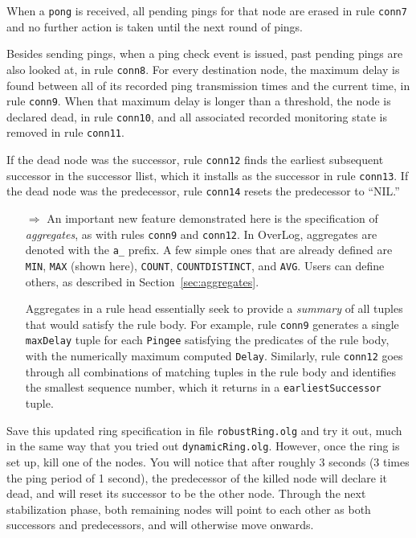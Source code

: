 \documentclass{article}
\begin{document}
When a \lstinline$pong$ is received, all pending pings for that node are
erased in rule \lstinline$conn7$ and no further action is taken until
the next round of pings.

Besides sending pings, when a ping check event is issued, past pending
pings are also looked at, in rule \lstinline$conn8$. For every
destination node, the maximum delay is found between all of its recorded
ping transmission times and the current time, in rule
\lstinline$conn9$. When that maximum delay is longer than a threshold,
the node is declared dead, in rule \lstinline$conn10$, and all
associated recorded monitoring state is removed in rule
\lstinline$conn11$.

If the dead node was the successor, rule \lstinline$conn12$ finds the
earliest subsequent successor in the successor llist, which it installs
as the successor in rule \lstinline$conn13$.  If the dead node was the
predecessor, rule \lstinline$conn14$ resets the predecessor to ``NIL.''

\begin{itemize}
\item[$\Longrightarrow$] An important new feature demonstrated here is
  the specification of \emph{aggregates}, as with rules
  \lstinline$conn9$ and \lstinline$conn12$.  In OverLog, aggregates are
  denoted with the \texttt{a\_} prefix. A few simple ones that are
  already defined are \lstinline$MIN$, \lstinline$MAX$ (shown here),
  \lstinline$COUNT$, \lstinline$COUNTDISTINCT$, and
  \lstinline$AVG$. Users can define others, as described in
  Section~\ref{sec:aggregates}.

  Aggregates in a rule head essentially seek to provide a \emph{summary}
  of all tuples that would satisfy the rule body.  For example, rule
  \lstinline$conn9$ generates a single \lstinline$maxDelay$ tuple for
  each \lstinline$Pingee$ satisfying the predicates of the rule body,
  with the numerically maximum computed \lstinline$Delay$.  Similarly,
  rule \lstinline$conn12$ goes through all combinations of matching
  tuples in the rule body and identifies the smallest sequence number,
  which it returns in a \lstinline$earliestSuccessor$ tuple.
\end{itemize}

Save this updated ring specification in file \texttt{robustRing.olg} and
try it out, much in the same way that you tried out
\texttt{dynamicRing.olg}. However, once the ring is set up, kill one of
the nodes. You will notice that after roughly 3 seconds (3 times the
ping period of 1 second), the predecessor
of the killed node will declare it dead, and will reset its successor to
be the other node.  Through the next stabilization phase, both remaining
nodes will point to each other as both successors and predecessors, and
will otherwise move onwards.
\end{document}
